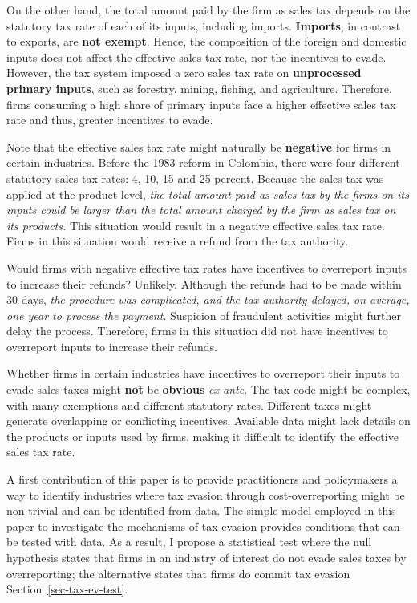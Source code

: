 \documentclass[
  12pt]{article}
\theoremstyle{definition}
\theoremstyle{remark}
\begin{document}
On the other hand, the total amount paid by the firm as sales tax
depends on the statutory tax rate of each of its inputs, including
imports. \textbf{Imports}, in contrast to exports, are \textbf{not
exempt}. Hence, the composition of the foreign and domestic inputs does
not affect the effective sales tax rate, nor the incentives to evade.
However, the tax system imposed a zero sales tax rate on
\textbf{unprocessed primary inputs}, such as forestry, mining, fishing,
and agriculture. Therefore, firms consuming a high share of primary
inputs face a higher effective sales tax rate and thus, greater
incentives to evade.

Note that the effective sales tax rate might naturally be
\textbf{negative} for firms in certain industries. Before the 1983
reform in Colombia, there were four different statutory sales tax rates:
4, 10, 15 and 25 percent. Because the sales tax was applied at the
product level, \emph{the total amount paid as sales tax by the firms on
its inputs could be larger than the total amount charged by the firm as
sales tax on its products.} This situation would result in a negative
effective sales tax rate. Firms in this situation would receive a refund
from the tax authority.

Would firms with negative effective tax rates have incentives to
overreport inputs to increase their refunds? Unlikely. Although the
refunds had to be made within 30 days, \emph{the procedure was
complicated, and the tax authority delayed, on average, one year to
process the payment}. Suspicion of fraudulent activities might further
delay the process. Therefore, firms in this situation did not have
incentives to overreport inputs to increase their refunds.

Whether firms in certain industries have incentives to overreport their
inputs to evade sales taxes might \textbf{not} be \textbf{obvious}
\emph{ex-ante}. The tax code might be complex, with many exemptions and
different statutory rates. Different taxes might generate overlapping or
conflicting incentives. Available data might lack details on the
products or inputs used by firms, making it difficult to identify the
effective sales tax rate.

A first contribution of this paper is to provide practitioners and
policymakers a way to identify industries where tax evasion through
cost-overreporting might be non-trivial and can be identified from data.
The simple model employed in this paper to investigate the mechanisms of
tax evasion provides conditions that can be tested with data. As a
result, I propose a statistical test where the null hypothesis states
that firms in an industry of interest do not evade sales taxes by
overreporting; the alternative states that firms do commit tax evasion
Section~\ref{sec-tax-ev-test}.
\end{document}
